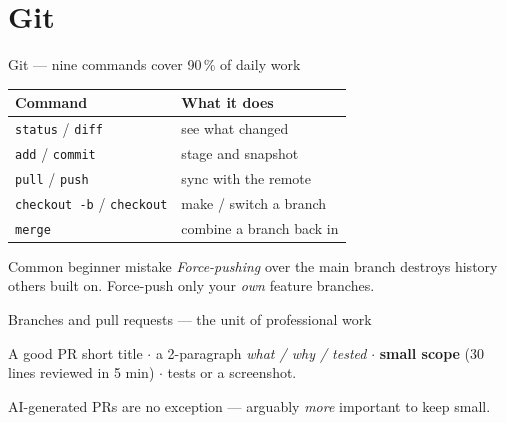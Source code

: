 \documentclass[aspectratio=169,11pt]{beamer}
\begin{document}
\section{Git}
\begin{frame}{Git --- nine commands cover 90\,\% of daily work}
  \small
  \begin{center}
  \begin{tabular}{ll}
    \toprule
    \textbf{Command} & \textbf{What it does} \\
    \midrule
    \texttt{status} / \texttt{diff}          & see what changed \\
    \texttt{add} / \texttt{commit}           & stage and snapshot \\
    \texttt{pull} / \texttt{push}            & sync with the remote \\
    \texttt{checkout -b} / \texttt{checkout} & make / switch a branch \\
    \texttt{merge}                            & combine a branch back in \\
    \bottomrule
  \end{tabular}
  \end{center}
  \begin{alertblock}{Common beginner mistake}
    \emph{Force-pushing} over the main branch destroys history others built on. Force-push only your \emph{own} feature branches.
  \end{alertblock}
\end{frame}

\begin{frame}{Branches and pull requests --- the unit of professional work}
  \begin{center}
  \end{center}
  \begin{block}{A good PR}
    short title $\cdot$ a 2-paragraph \emph{what / why / tested} $\cdot$ \textbf{small scope} (30 lines reviewed in 5 min) $\cdot$ tests or a screenshot.
  \end{block}
  {\footnotesize AI-generated PRs are no exception --- arguably \emph{more} important to keep small.}
\end{frame}
\end{document}

